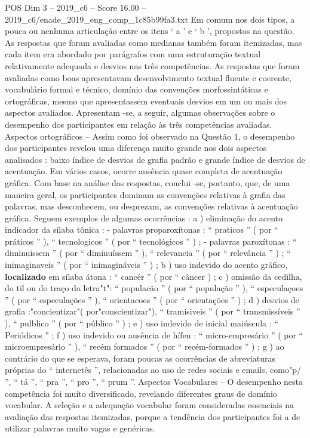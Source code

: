 \begin{textsample}{POS Dim 3 – 2019\_c6 – Score 16.00 – 2019\_c6/enade\_2019\_eng\_comp\_1c85b99fa3.txt}
Em comum nos dois tipos, a pouca ou nenhuma articulação entre os itens ‘ a ’ e ‘ b ’, propostos na questão.
As respostas que foram avaliadas como medianas também foram itemizadas, mas cada item era abordado por parágrafos com uma estruturação textual relativamente adequada e desvios nas três competências.
As respostas que foram avaliadas como boas apresentavam desenvolvimento textual fluente e coerente, vocabulário formal e técnico, domínio das convenções morfossintáticas e ortográficas, mesmo que apresentassem eventuais desvios em um ou mais dos aspectos avaliados.
Apresentam -se, a seguir, algumas observações sobre o desempenho dos participantes em relação às três competências avaliadas.
Aspectos ortográficos – Assim como foi observado na Questão 1, o desempenho dos participantes revelou uma diferença muito grande nos dois aspectos analisados : baixo índice de desvios de grafia padrão e grande índice de desvios de acentuação.
Em vários casos, ocorre ausência quase completa de acentuação gráfica.
Com base na análise das respostas, conclui -se, portanto, que, de uma maneira geral, os participantes dominam as convenções relativas à grafia das palavras, mas desconhecem, ou desprezam, as convenções relativas à acentuação gráfica.
Seguem exemplos de algumas ocorrências : a ) eliminação do acento indicador da sílaba tônica : - palavras proparoxítonas : “ praticos ” ( por “ práticos ” ), “ tecnologicos ” ( por “ tecnológicos ” ) ; - palavras paroxítonas : “ diminuissem ” ( por “ diminuíssem ” ), “ relevancia ” ( por “ relevância ” ) ; “ inimaginaveis ” ( por “ inimagináveis ” ) ; b ) uso indevido do acento gráfico, \textbf{localizado} em sílaba átona : “ cancêr ” ( por “ câncer ) ; c ) omissão da cedilha, do til ou do traço da letra"t": “ populacão ” ( por “ população ” ), “ especulaçoes ” ( por “ especulações ” ), “ orientacoes ” ( por “ orientações ” ) ; d ) desvios de grafia :"concientizar"( por"conscientizar"), “ tramisiveis ” ( por “ transmissíveis ” ), “ pulblico ” ( por “ público ” ) ; e ) uso indevido de inicial maiúscula : “ Periódicos ” ; f ) uso indevido ou ausência de hífen : “ micro-empresário ” ( por “ microempresário ” ), “ recém formados ” ( por “ recém-formados ” ) ; g ) ao contrário do que se esperava, foram poucas as ocorrências de abreviaturas próprias do “ internetês ”, relacionadas ao uso de redes sociais e emails, como"p/ ”, “ tá ”, “ pra ”, “ pro ”, “ prum ”.
Aspectos Vocabulares – O desempenho nesta competência foi muito diversificado, revelando diferentes graus de domínio vocabular.
A seleção e a adequação vocabular foram consideradas essenciais na avaliação das respostas itemizadas, porque a tendência dos participantes foi a de utilizar palavras muito vagas e genéricas.

\end{textsample}
